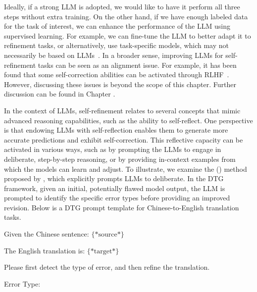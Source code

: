 Ideally, if a strong LLM is adopted, we would like to have it perform all three steps without extra training. On the other hand, if we have enough labeled data for the task of interest, we can enhance the performance of the LLM using supervised learning. For example, we can fine-tune the LLM to better adapt it to refinement tasks, or alternatively, use task-specific models, which may not necessarily be based on LLMs~\cite{welleck-etal:2023generating,schick-etal:2023peer}. In a broader sense, improving LLMs for self-refinement tasks can be seen as an alignment issue. For example, it has been found that some self-correction abilities can be activated through RLHF~\cite{ganguli-etal:2023capacity}. However, discussing these issues is beyond the scope of this chapter. Further discussion can be found in Chapter \ChapterLLMTuning.

In the context of LLMs, self-refinement relates to several concepts that mimic advanced reasoning capabilities, such as the ability to self-reflect. One perspective is that endowing LLMs with self-reflection enables them to generate more accurate predictions and exhibit self-correction. This reflective capacity can be activated in various ways, such as by prompting the LLMs to engage in deliberate, step-by-step reasoning, or by providing in-context examples from which the models can learn and adjust. To illustrate, we examine the  () method proposed by \citet{li2023-etal:deliberate}, which explicitly prompts LLMs to deliberate. In the DTG framework, given an initial, potentially flawed model output, the LLM is prompted to identify the specific error types before providing an improved revision. Below is a DTG prompt template for Chinese-to-English translation tasks.

\vspace{0.5em}
\begin{tcolorbox}

\begingroup
\setlength{\leftskip}{2em}
\setlength{\rightskip}{2em}

Given the Chinese sentence: $\{*\mathrm{source}*\}$

\vspace{0.2em}

The English translation is: $\{*\mathrm{target}*\}$


\vspace{0.5em}

Please first detect the type of error, and then refine the translation.

\vspace{0.2em}

Error Type: \underline{}

\vspace{0.2em}

\underline{}

\endgroup

\end{tcolorbox}
\vspace{0.5em}


